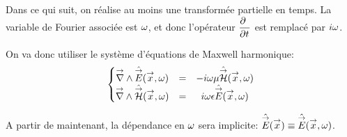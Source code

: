Dans ce qui suit, on réalise au moins une transformée partielle en temps. La variable de Fourier associée est \(\w\), et donc l'opérateur \(\ddr{t}{~}\) est remplacé par \(i\w\).


On va donc utiliser le système d'équations de Maxwell harmonique:
\begin{equation}
    \left\lbrace 
    \begin{matrix}
    \vrot \hat \vE(\vx,\w)  &=& -i \omega \mu \hat \vH(\vx,\w)  \\
    \vrot \hat \vH(\vx,\w)  &=& i \omega \eps \hat \vE(\vx,\w) 
    \end{matrix}
    \right.
    \label{eq:imp_fourier:intro:maxwell_harmonique}
\end{equation}

A partir de maintenant, la dépendance en \(\w\) sera implicite: \(\hat \vE(\vx) \equiv \hat \vE (\vx, \w)\).